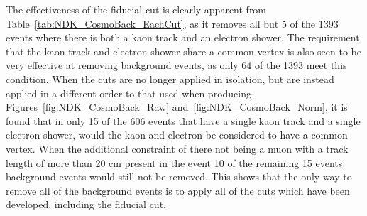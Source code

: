 \begin{table}
  \caption[The number of events which could mimic a $n \rightarrow K^{+} + e^{-}$ decay, when cuts are applied in isolation]
          {The number of events which could mimic a $n \rightarrow K^{+} + e^{-}$ decay, when cuts are applied in isolation. Cuts are applied after it is required that the event contains at least one kaon track and at least one electron shower. It is found that 1393 events have at least one kaon track and at least one electron shower, this is shown in the top row of the table. The fiducial cut of 2 cm is seen to remove almost all of the events considered.}
  \centering
  \label{tab:NDK_CosmoBack_EachCut}
\end{table}

The effectiveness of the fiducial cut is clearly apparent from Table~\ref{tab:NDK_CosmoBack_EachCut}, as it removes all but 5 of the 1393 events where there is both a kaon track and an electron shower. The requirement that the kaon track and electron shower share a common vertex is also seen to be very effective at removing background events, as only 64 of the 1393 meet this condition. When the cuts are no longer applied in isolation, but are instead applied in a different order to that used when producing Figures~\ref{fig:NDK_CosmoBack_Raw} and~\ref{fig:NDK_CosmoBack_Norm}, it is found that in only 15 of the 606 events that have a single kaon track and a single electron shower, would the kaon and electron be considered to have a common vertex. When the additional constraint of there not being a muon with a track length of more than 20 cm present in the event 10 of the remaining 15 events background events would still not be removed. This shows that the only way to remove all of the background events is to apply all of the cuts which have been developed, including the fiducial cut. \\

